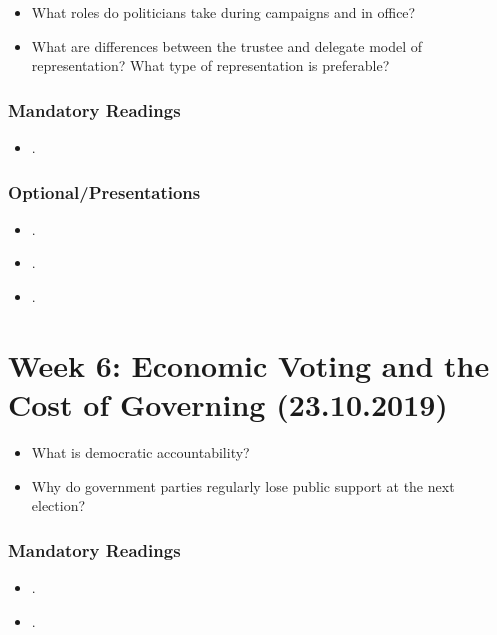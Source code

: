 \documentclass[abstract=on,parskip=full,headings=standardclasses,fontsize=11pt,paper=a4]{scrartcl}
\begin{document}
\begin{itemize}
\renewcommand\labelitemi{--}
\item What roles do politicians take during campaigns and in office? 
\item What are differences between the trustee and delegate model of representation? What type of representation is preferable?
\end{itemize}


\subsubsection*{Mandatory Readings}
\begin{itemize}
\item {}.
\end{itemize}


\subsubsection*{Optional/Presentations}
\begin{itemize}
\item {}.
\item {}.
\item {}.
\end{itemize}



\section{Week 6: Economic Voting and the Cost of Governing (23.10.2019)}


\begin{itemize}
\renewcommand\labelitemi{--}
\item What is democratic accountability?
\item Why do government parties  regularly lose public support at the next election?
\end{itemize}

\subsubsection*{Mandatory Readings}

\begin{itemize}
\item {}.
\item {}.
\end{itemize}
\end{document}
